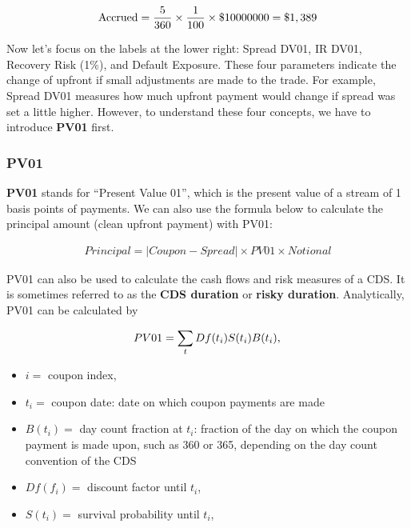 \documentclass{jss}
\begin{document}
\begin{equation}
 \begin{aligned}
  {\rm Accrued = \frac{5}{360} \times \frac{1}{100} \times \$10000000 = \$1,389}
    \end{aligned}
\end{equation}

Now let's focus on the labels at the lower right: Spread DV01, IR DV01, Recovery Risk (1\%), and Default Exposure. These four parameters indicate the change of upfront if small adjustments are made to the trade. For example, Spread DV01 measures how much upfront payment would change if spread was set a little higher. However, to understand these four concepts, we have to introduce \textbf{PV01} first.

\subsubsection{PV01}
\label{sec:PV01}

\textbf{PV01} stands for ``Present Value 01'', which is the present value of a stream of 1 basis points of payments. We can also use the formula below to calculate the principal amount (clean upfront payment) with PV01:

\begin{equation}
 \begin{aligned}
  Principal = |Coupon - Spread| \times PV01 \times Notional
    \end{aligned}
\end{equation}

PV01 can also be used to calculate the cash flows and risk measures of a CDS. It is sometimes referred to as the \textbf{CDS duration} or \textbf{risky duration}. Analytically, PV01 can be calculated by

\begin{displaymath}
PV01 =  \sum_tDf(t_i)S(t_i)B(t_i), \nonumber\\
\end{displaymath}
\begin{itemize}
\item $i =$ coupon index,
\item $t_i =$ coupon date: date on which coupon payments are made
\item $B(t_i) =$ day count fraction at $t_i$: fraction of the day on which the coupon payment is made upon, such as 360 or 365, depending on the day count convention of the CDS
\item $Df(f_i) =$ discount factor until $t_i$,
\item $S(t_i) =$ survival probability until $t_i$,
\end{itemize}
\end{document}
